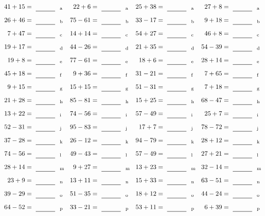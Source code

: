 \documentclass
[
  draft    = true,
  fontsize = 11pt,
  parskip  = half-
]
{scrartcl}
\begin{document}
\clearpage
\begin{align*}
    \pline{41+15}&=\rline{a}
  & \pline{22+6}&=\rline{a}
  & \pline{25+38}&=\rline{a}
  & \pline{27+8}&=\rline{a} \\[1ex]
    \pline{26+46}&=\rline{b}
  & \pline{75-61}&=\rline{b}
  & \pline{33-17}&=\rline{b}
  & \pline{9+18}&=\rline{b} \\[1ex]
    \pline{7+47}&=\rline{c}
  & \pline{14+14}&=\rline{c}
  & \pline{54+27}&=\rline{c}
  & \pline{46+8}&=\rline{c} \\[1ex]
    \pline{19+17}&=\rline{d}
  & \pline{44-26}&=\rline{d}
  & \pline{21+35}&=\rline{d}
  & \pline{54-39}&=\rline{d} \\[1ex]
    \pline{19+8}&=\rline{e}
  & \pline{77-61}&=\rline{e}
  & \pline{18+6}&=\rline{e}
  & \pline{28+14}&=\rline{e} \\[1ex]
    \pline{45+18}&=\rline{f}
  & \pline{9+36}&=\rline{f}
  & \pline{31-21}&=\rline{f}
  & \pline{7+65}&=\rline{f} \\[1ex]
    \pline{9+15}&=\rline{g}
  & \pline{15+15}&=\rline{g}
  & \pline{51-31}&=\rline{g}
  & \pline{7+18}&=\rline{g} \\[1ex]
    \pline{21+28}&=\rline{h}
  & \pline{85-81}&=\rline{h}
  & \pline{15+25}&=\rline{h}
  & \pline{68-47}&=\rline{h} \\[1ex]
    \pline{13+22}&=\rline{i}
  & \pline{74-56}&=\rline{i}
  & \pline{57-49}&=\rline{i}
  & \pline{25+7}&=\rline{i} \\[1ex]
    \pline{52-31}&=\rline{j}
  & \pline{95-83}&=\rline{j}
  & \pline{17+7}&=\rline{j}
  & \pline{78-72}&=\rline{j} \\[1ex]
    \pline{37-28}&=\rline{k}
  & \pline{26-12}&=\rline{k}
  & \pline{94-79}&=\rline{k}
  & \pline{28+12}&=\rline{k} \\[1ex]
    \pline{74-56}&=\rline{l}
  & \pline{49-43}&=\rline{l}
  & \pline{57-49}&=\rline{l}
  & \pline{27+21}&=\rline{l} \\[1ex]
    \pline{28+14}&=\rline{m}
  & \pline{9+27}&=\rline{m}
  & \pline{13+23}&=\rline{m}
  & \pline{32-14}&=\rline{m} \\[1ex]
    \pline{23+9}&=\rline{n}
  & \pline{13+11}&=\rline{n}
  & \pline{15+33}&=\rline{n}
  & \pline{63-51}&=\rline{n} \\[1ex]
    \pline{39-29}&=\rline{o}
  & \pline{51-35}&=\rline{o}
  & \pline{18+12}&=\rline{o}
  & \pline{44-24}&=\rline{o} \\[1ex]
    \pline{64-52}&=\rline{p}
  & \pline{33-21}&=\rline{p}
  & \pline{53+11}&=\rline{p}
  & \pline{6+39}&=\rline{p}
\end{align*}
\end{document}
